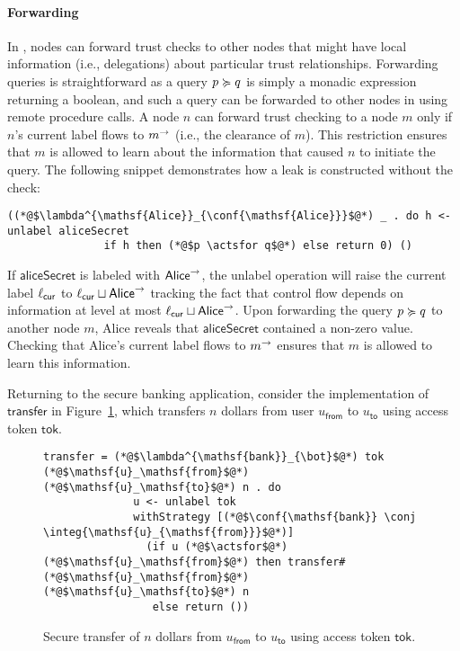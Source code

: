 \paragraph{Forwarding}
In \lang{}, nodes can forward trust checks to other nodes that might have local information (i.e., delegations) about particular trust relationships. Forwarding queries is straightforward as a query $p \succcurlyeq q$ is simply a monadic expression returning a boolean, and such a query can be forwarded to other nodes in \lang{} using remote procedure calls.
A node $n$ can forward trust checking to a node $m$ only if $n$'s current label flows to $m^{\rightarrow}$ (i.e., the clearance of $m$). This restriction ensures that $m$ is allowed to learn about the information that caused $n$ to initiate the query.  The following snippet demonstrates how a leak is constructed without the check:
\begin{lstlisting}
((*@$\lambda^{\mathsf{Alice}}_{\conf{\mathsf{Alice}}}$@*) _ . do h <- unlabel aliceSecret
               if h then (*@$p \actsfor q$@*) else return 0) ()
\end{lstlisting}
If $\mathsf{aliceSecret}$ is labeled with $\mathsf{Alice}^{\rightarrow}$, the unlabel operation will raise the current label $\ell_{\mathsf{cur}}$ to $\ell_{\mathsf{cur}} \sqcup \mathsf{Alice}^{\rightarrow}$ tracking the fact that control flow depends on information at level at most $\ell_{\mathsf{cur}} \sqcup \mathsf{Alice}^{\rightarrow}$. Upon forwarding the query $p \succcurlyeq q$ to another node $m$, Alice reveals that $\mathsf{aliceSecret}$ contained a non-zero value. Checking that Alice's current label flows to $m^{\rightarrow}$ ensures that $m$ is allowed to learn this information.

Returning to the secure banking application, consider the implementation of $\mathsf{transfer}$ in Figure~\ref{fig:sec-transfer}, which transfers $n$ dollars from user $u_\mathsf{from}$ to $u_\mathsf{to}$ using access token $\mathsf{tok}$.

\begin{figure}
\centering
\begin{lstlisting}
transfer = (*@$\lambda^{\mathsf{bank}}_{\bot}$@*) tok (*@$\mathsf{u}_\mathsf{from}$@*) (*@$\mathsf{u}_\mathsf{to}$@*) n . do
              u <- unlabel tok
              withStrategy [(*@$\conf{\mathsf{bank}} \conj \integ{\mathsf{u}_{\mathsf{from}}}$@*)]
                (if u (*@$\actsfor$@*) (*@$\mathsf{u}_\mathsf{from}$@*) then transfer# (*@$\mathsf{u}_\mathsf{from}$@*) (*@$\mathsf{u}_\mathsf{to}$@*) n
                 else return ())
\end{lstlisting}
\caption{Secure transfer of $n$ dollars from $u_{\mathsf{from}}$ to $u_{\mathsf{to}}$ using access token $\mathsf{tok}$.}
\label{fig:sec-transfer}
\end{figure}

